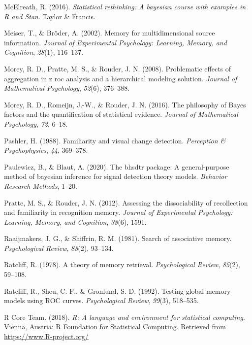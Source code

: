 \documentclass[
  english,
  ,man,floatsintext]{apa6}
\begin{document}
\leavevmode\hypertarget{ref-McElreath2016}{}%
McElreath, R. (2016). \emph{Statistical rethinking: A bayesian course with examples in R and Stan}. Taylor \& Francis.

\leavevmode\hypertarget{ref-MeiserAndBroder2002}{}%
Meiser, T., \& Bröder, A. (2002). Memory for multidimensional source information. \emph{Journal of Experimental Psychology: Learning, Memory, and Cognition}, \emph{28}(1), 116--137.

\leavevmode\hypertarget{ref-morey2008problematic}{}%
Morey, R. D., Pratte, M. S., \& Rouder, J. N. (2008). Problematic effects of aggregation in z roc analysis and a hierarchical modeling solution. \emph{Journal of Mathematical Psychology}, \emph{52}(6), 376--388.

\leavevmode\hypertarget{ref-MoreyEtAl2016}{}%
Morey, R. D., Romeijn, J.-W., \& Rouder, J. N. (2016). The philosophy of Bayes factors and the quantification of statistical evidence. \emph{Journal of Mathematical Psychology}, \emph{72}, 6--18.

\leavevmode\hypertarget{ref-Pashler1988}{}%
Pashler, H. (1988). Familiarity and visual change detection. \emph{Perception \& Psychophysics}, \emph{44}, 369--378.

\leavevmode\hypertarget{ref-paulewicz2020bhsdtr}{}%
Paulewicz, B., \& Blaut, A. (2020). The bhsdtr package: A general-purpose method of bayesian inference for signal detection theory models. \emph{Behavior Research Methods}, 1--20.

\leavevmode\hypertarget{ref-pratte2012assessing}{}%
Pratte, M. S., \& Rouder, J. N. (2012). Assessing the dissociability of recollection and familiarity in recognition memory. \emph{Journal of Experimental Psychology: Learning, Memory, and Cognition}, \emph{38}(6), 1591.

\leavevmode\hypertarget{ref-RaaijmakersAndShiffrin1981}{}%
Raaijmakers, J. G., \& Shiffrin, R. M. (1981). Search of associative memory. \emph{Psychological Review}, \emph{88}(2), 93--134.

\leavevmode\hypertarget{ref-Ratcliff1978}{}%
Ratcliff, R. (1978). A theory of memory retrieval. \emph{Psychological Review}, \emph{85}(2), 59--108.

\leavevmode\hypertarget{ref-RatcliffEtAl1992}{}%
Ratcliff, R., Sheu, C.-F., \& Gronlund, S. D. (1992). Testing global memory models using ROC curves. \emph{Psychological Review}, \emph{99}(3), 518--535.

\leavevmode\hypertarget{ref-rteam}{}%
R Core Team. (2018). \emph{R: A language and environment for statistical computing}. Vienna, Austria: R Foundation for Statistical Computing. Retrieved from \url{https://www.R-project.org/}
\end{document}

